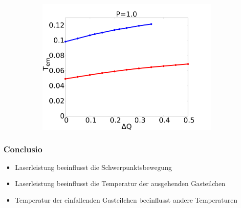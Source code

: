 \documentclass[handout]{beamer}
\begin{document}
\begin{frame}
\begin{figure}
\begin{center}
\begin{subfigure}[t]{0.3\textwidth}
            \includegraphics[scale=0.11]{../images/p1_out.pdf}
        \end{subfigure} 
    \end{center}
\end{figure}
\end{frame}



\begin{frame}
\frametitle{Conclusio}
\begin{itemize}
\item Laserleistung beeinflusst die Schwerpunktsbewegung
\item Laserleistung beeinflusst die Temperatur der ausgehenden Gasteilchen 
\item Temperatur der einfallenden Gasteilchen beeinflusst andere Temperaturen 
\end{itemize}
\end{frame}



\end{document}
